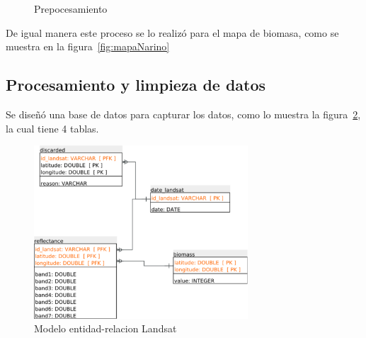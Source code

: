 \begin{figure}
  \centering
  \vfill
  \caption{Prepocesamiento}
  \label{fig:Recortar imágenes}
\end{figure}

De igual manera este proceso se lo realizó para el mapa de biomasa, como se muestra en la figura~\ref{fig:mapaNarino}


\subsection{Procesamiento y limpieza de datos}

Se diseñó una base de datos para capturar los datos,
como lo muestra la figura~\ref{fig:landsatET}, la cual tiene 4 tablas. 

\begin{figure}
  \centering
  \includegraphics[width = 8cm]{landsatET.pdf}
  \caption{Modelo entidad-relacion Landsat}
  \label{fig:landsatET}
\end{figure}

